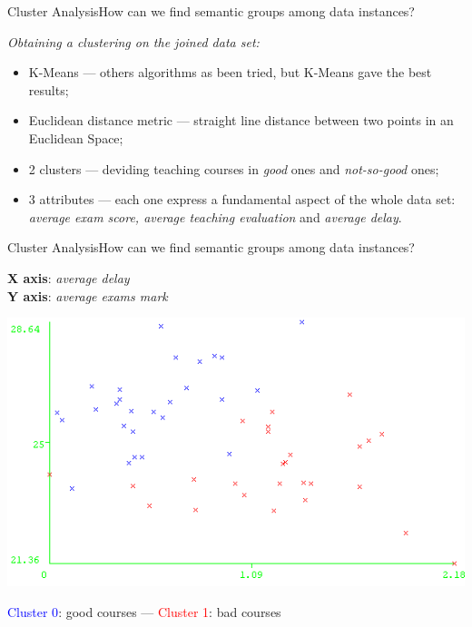 \begin{frame}{Cluster Analysis}{How can we find semantic groups among data instances?}

 \centering\textit{Obtaining a clustering on the joined data set:} \vspace{0,3cm}

	\begin{block}{}
		\begin{itemize}
			\item<1-> \alert{K-Means} --- others algorithms as been tried, but K-Means gave the best results;
            \item<2-> \alert{Euclidean distance metric} --- straight line distance between two points in an Euclidean Space;
			\item<3-> \alert{2 clusters} --- deviding teaching courses in \emph{good} ones and \emph{not-so-good} ones;
			\item<4-> \alert{3 attributes} --- each one express a fundamental aspect of the whole data set: \emph{average exam score, average teaching evaluation} and \emph{average delay}.
		\end{itemize}
	\end{block}

\end{frame}

\begin{frame}{Cluster Analysis}{How can we find semantic groups among data instances?}

    \textbf{X axis}: \emph{average delay} \\ \textbf{Y axis}: \emph{average exams mark}

    \vspace{0.1cm}
    \begin{centering}
        \hspace{0.5cm}\includegraphics[scale=0.46]{cluster1.png}
    \end{centering}

    \textcolor{blue}{Cluster 0}: good courses --- \textcolor{red}{Cluster 1}: bad courses

\end{frame}

